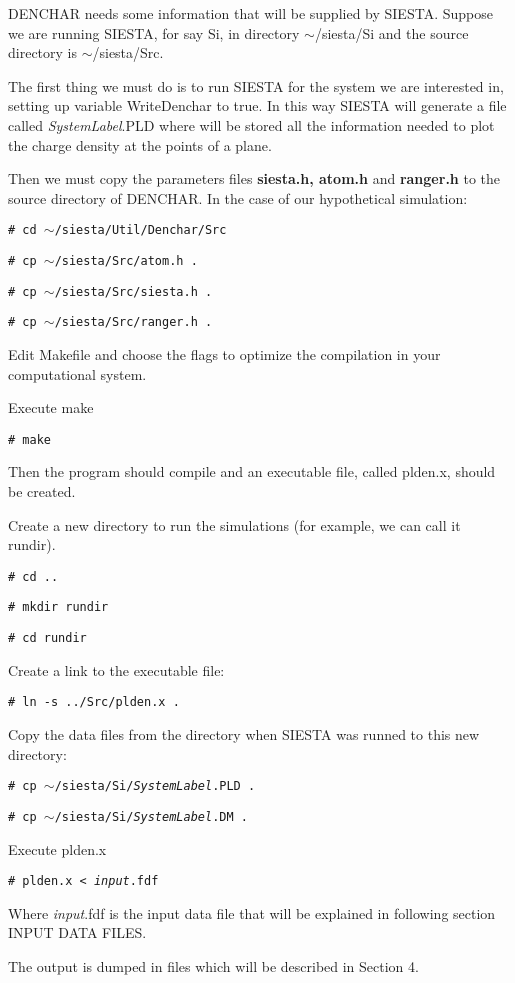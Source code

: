 DENCHAR needs some information that will be supplied by SIESTA. Suppose 
we are running SIESTA, for say Si, in directory $\sim$/siesta/Si and the
source directory is $\sim$/siesta/Src. 

The first thing we must do is to run SIESTA for the system we are interested in,
setting up variable WriteDenchar to true. In this way SIESTA will generate
a file called {\it SystemLabel}.PLD where will be stored all the information 
needed to plot the charge density at the points of a plane.

Then we must copy the parameters files {\bf siesta.h, atom.h}
and {\bf ranger.h} to
the source directory of DENCHAR. In the case of our hypothetical simulation:

{\tt \# cd $\sim$/siesta/Util/Denchar/Src}

{\tt \# cp $\sim$/siesta/Src/atom.h .}

{\tt \# cp $\sim$/siesta/Src/siesta.h .}

{\tt \# cp $\sim$/siesta/Src/ranger.h .}

Edit Makefile and choose the flags to optimize the compilation in your
computational system.

Execute make

{\tt \# make}

Then the program should compile and an executable file, called plden.x, 
should be created.

Create a new directory to run the simulations (for example, 
we can call it rundir).

{\tt \# cd ..}

{\tt \# mkdir rundir }

{\tt \# cd rundir }

Create a link to the executable file:

{\tt \# ln -s ../Src/plden.x . }

Copy the data files from the directory when SIESTA was runned to this new 
directory:

{\tt \# cp $\sim$/siesta/Si/{\it SystemLabel}.PLD . } 

{\tt \# cp $\sim$/siesta/Si/{\it SystemLabel}.DM . } 

Execute plden.x

{\tt \# plden.x < {\it input}.fdf } 

Where {\it input}.fdf is the input data file that will be explained in 
following section INPUT DATA FILES.

The output is dumped in files which will be described
in Section 4.

